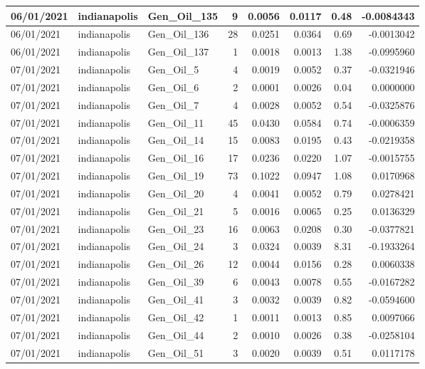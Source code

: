 \documentclass[
  letterpaper,
  DIV=11,
  numbers=noendperiod]{scrartcl}
\begin{document}
\begin{tabular}{l|l|l|r|r|r|r|r}
\hline
06/01/2021 & indianapolis & Gen\_Oil\_135 & 9 & 0.0056 & 0.0117 & 0.48 & -0.0084343\\
\hline
06/01/2021 & indianapolis & Gen\_Oil\_136 & 28 & 0.0251 & 0.0364 & 0.69 & -0.0013042\\
\hline
06/01/2021 & indianapolis & Gen\_Oil\_137 & 1 & 0.0018 & 0.0013 & 1.38 & -0.0995960\\
\hline
07/01/2021 & indianapolis & Gen\_Oil\_5 & 4 & 0.0019 & 0.0052 & 0.37 & -0.0321946\\
\hline
07/01/2021 & indianapolis & Gen\_Oil\_6 & 2 & 0.0001 & 0.0026 & 0.04 & 0.0000000\\
\hline
07/01/2021 & indianapolis & Gen\_Oil\_7 & 4 & 0.0028 & 0.0052 & 0.54 & -0.0325876\\
\hline
07/01/2021 & indianapolis & Gen\_Oil\_11 & 45 & 0.0430 & 0.0584 & 0.74 & -0.0006359\\
\hline
07/01/2021 & indianapolis & Gen\_Oil\_14 & 15 & 0.0083 & 0.0195 & 0.43 & -0.0219358\\
\hline
07/01/2021 & indianapolis & Gen\_Oil\_16 & 17 & 0.0236 & 0.0220 & 1.07 & -0.0015755\\
\hline
07/01/2021 & indianapolis & Gen\_Oil\_19 & 73 & 0.1022 & 0.0947 & 1.08 & 0.0170968\\
\hline
07/01/2021 & indianapolis & Gen\_Oil\_20 & 4 & 0.0041 & 0.0052 & 0.79 & 0.0278421\\
\hline
07/01/2021 & indianapolis & Gen\_Oil\_21 & 5 & 0.0016 & 0.0065 & 0.25 & 0.0136329\\
\hline
07/01/2021 & indianapolis & Gen\_Oil\_23 & 16 & 0.0063 & 0.0208 & 0.30 & -0.0377821\\
\hline
07/01/2021 & indianapolis & Gen\_Oil\_24 & 3 & 0.0324 & 0.0039 & 8.31 & -0.1933264\\
\hline
07/01/2021 & indianapolis & Gen\_Oil\_26 & 12 & 0.0044 & 0.0156 & 0.28 & 0.0060338\\
\hline
07/01/2021 & indianapolis & Gen\_Oil\_39 & 6 & 0.0043 & 0.0078 & 0.55 & -0.0167282\\
\hline
07/01/2021 & indianapolis & Gen\_Oil\_41 & 3 & 0.0032 & 0.0039 & 0.82 & -0.0594600\\
\hline
07/01/2021 & indianapolis & Gen\_Oil\_42 & 1 & 0.0011 & 0.0013 & 0.85 & 0.0097066\\
\hline
07/01/2021 & indianapolis & Gen\_Oil\_44 & 2 & 0.0010 & 0.0026 & 0.38 & -0.0258104\\
\hline
07/01/2021 & indianapolis & Gen\_Oil\_51 & 3 & 0.0020 & 0.0039 & 0.51 & 0.0117178\\

\end{tabular}
\end{document}
